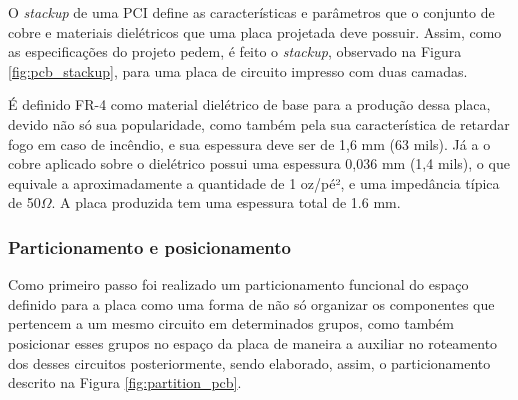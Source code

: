 O \textit{stackup} de uma PCI define as características e parâmetros que o conjunto de cobre e materiais dielétricos que uma placa projetada deve possuir. Assim, como as especificações do projeto pedem, é feito o \textit{stackup}, observado na Figura \ref{fig:pcb_stackup}, para uma placa de circuito impresso com duas camadas.

É definido FR-4 como material dielétrico de base para a produção dessa placa, devido não só sua popularidade, como também pela sua característica de retardar fogo em caso de incêndio, e sua espessura deve ser de 1,6 mm (63 mils). Já a o cobre aplicado sobre o dielétrico possui uma espessura 0,036 mm (1,4 mils), o que equivale a aproximadamente a quantidade de 1 oz/pé², e uma impedância típica de 50$\Omega$. A placa produzida tem uma espessura total de 1.6 mm.


    \begin{figure}[h!]
            \captionsetup{width=7cm}
   \end{figure}  


\subsubsection{Particionamento e posicionamento}

Como primeiro passo foi realizado um particionamento funcional do espaço definido para a placa como uma forma de não só organizar os componentes que pertencem a um mesmo circuito em determinados grupos, como também posicionar esses grupos no espaço da placa de maneira a auxiliar no roteamento dos desses circuitos posteriormente, sendo elaborado, assim, o particionamento descrito na Figura \ref{fig:partition_pcb}.


